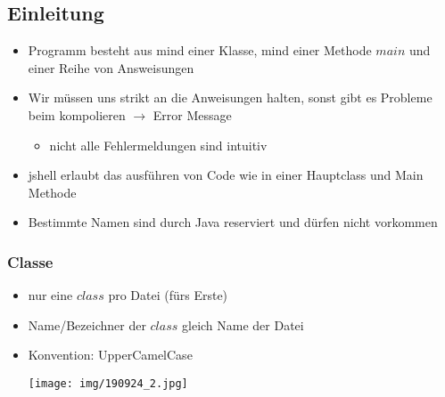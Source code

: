 \documentclass[11pt]{article}
\begin{document}
\subsection{Einleitung}
\label{sec:org5bce39f}
\begin{itemize}
\item Programm besteht aus mind einer Klasse, mind einer Methode \(main\) und einer Reihe von Answeisungen\\
\item Wir müssen uns strikt an die Anweisungen halten, sonst gibt es Probleme beim kompolieren \(\rightarrow\) Error Message\\
\begin{itemize}
\item nicht alle Fehlermeldungen sind intuitiv\\
\end{itemize}
\item jshell erlaubt das ausführen von Code wie in einer Hauptclass und Main Methode\\

\item Bestimmte Namen sind durch Java reserviert und dürfen nicht vorkommen\\
\end{itemize}

\subsubsection{Classe}
\label{sec:org8560afb}
\begin{itemize}
\item nur eine \(class\) pro Datei (fürs Erste)\\
\item Name/Bezeichner der \(class\) gleich Name der Datei\\
\item Konvention: UpperCamelCase\\
\begin{center}
\texttt{[image: img/190924\_2.jpg]}
\end{center}
\end{itemize}
\end{document}
